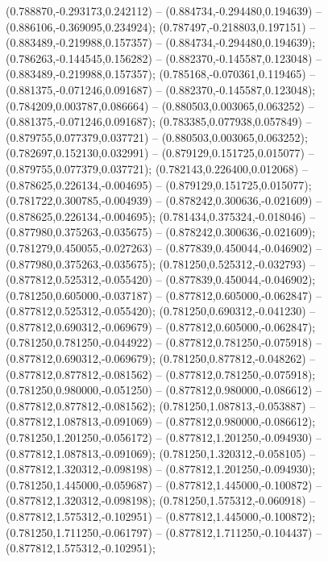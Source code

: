  (0.788870,-0.293173,0.242112) -- (0.884734,-0.294480,0.194639) -- (0.886106,-0.369095,0.234924);
 (0.787497,-0.218803,0.197151) -- (0.883489,-0.219988,0.157357) -- (0.884734,-0.294480,0.194639);
 (0.786263,-0.144545,0.156282) -- (0.882370,-0.145587,0.123048) -- (0.883489,-0.219988,0.157357);
 (0.785168,-0.070361,0.119465) -- (0.881375,-0.071246,0.091687) -- (0.882370,-0.145587,0.123048);
 (0.784209,0.003787,0.086664) -- (0.880503,0.003065,0.063252) -- (0.881375,-0.071246,0.091687);
 (0.783385,0.077938,0.057849) -- (0.879755,0.077379,0.037721) -- (0.880503,0.003065,0.063252);
 (0.782697,0.152130,0.032991) -- (0.879129,0.151725,0.015077) -- (0.879755,0.077379,0.037721);
 (0.782143,0.226400,0.012068) -- (0.878625,0.226134,-0.004695) -- (0.879129,0.151725,0.015077);
 (0.781722,0.300785,-0.004939) -- (0.878242,0.300636,-0.021609) -- (0.878625,0.226134,-0.004695);
 (0.781434,0.375324,-0.018046) -- (0.877980,0.375263,-0.035675) -- (0.878242,0.300636,-0.021609);
 (0.781279,0.450055,-0.027263) -- (0.877839,0.450044,-0.046902) -- (0.877980,0.375263,-0.035675);
 (0.781250,0.525312,-0.032793) -- (0.877812,0.525312,-0.055420) -- (0.877839,0.450044,-0.046902);
 (0.781250,0.605000,-0.037187) -- (0.877812,0.605000,-0.062847) -- (0.877812,0.525312,-0.055420);
 (0.781250,0.690312,-0.041230) -- (0.877812,0.690312,-0.069679) -- (0.877812,0.605000,-0.062847);
 (0.781250,0.781250,-0.044922) -- (0.877812,0.781250,-0.075918) -- (0.877812,0.690312,-0.069679);
 (0.781250,0.877812,-0.048262) -- (0.877812,0.877812,-0.081562) -- (0.877812,0.781250,-0.075918);
 (0.781250,0.980000,-0.051250) -- (0.877812,0.980000,-0.086612) -- (0.877812,0.877812,-0.081562);
 (0.781250,1.087813,-0.053887) -- (0.877812,1.087813,-0.091069) -- (0.877812,0.980000,-0.086612);
 (0.781250,1.201250,-0.056172) -- (0.877812,1.201250,-0.094930) -- (0.877812,1.087813,-0.091069);
 (0.781250,1.320312,-0.058105) -- (0.877812,1.320312,-0.098198) -- (0.877812,1.201250,-0.094930);
 (0.781250,1.445000,-0.059687) -- (0.877812,1.445000,-0.100872) -- (0.877812,1.320312,-0.098198);
 (0.781250,1.575312,-0.060918) -- (0.877812,1.575312,-0.102951) -- (0.877812,1.445000,-0.100872);
 (0.781250,1.711250,-0.061797) -- (0.877812,1.711250,-0.104437) -- (0.877812,1.575312,-0.102951);
